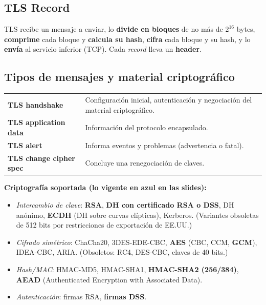\documentclass[11pt,a4paper]{article}
\begin{document}
\subsection{TLS Record}
TLS recibe un mensaje a enviar, lo \textbf{divide en bloques} de no más de $2^{16}$ bytes,
\textbf{comprime} cada bloque y \textbf{calcula su hash}, \textbf{cifra} cada bloque y su hash,
y lo \textbf{envía} al servicio inferior (TCP). Cada \emph{record} lleva un \textbf{header}.

\subsection{Tipos de mensajes y material criptográfico}

\begin{center}
\renewcommand{\arraystretch}{1.2}
\begin{tabular}{>{\bfseries}p{3.8cm} p{9.6cm}}
\toprule
TLS handshake & Configuración inicial, autenticación y negociación del material criptográfico.\\
TLS application data & Información del protocolo encapsulado.\\
TLS alert & Informa eventos y problemas (advertencia o fatal).\\
TLS change cipher spec & Concluye una renegociación de claves.\\
\bottomrule
\end{tabular}
\end{center}

\begin{slidebox}
\textbf{Criptografía soportada (lo vigente en azul en las slides):}
\begin{itemize}[leftmargin=1.4em,itemsep=0pt]
  \item \emph{Intercambio de clave}: \textbf{RSA}, \textbf{DH con certificado RSA o DSS}, DH
        anónimo, \textbf{ECDH} (DH sobre curvas elípticas), Kerberos. (Variantes obsoletas de
        512 bits por restricciones de exportación de EE.UU.)
  \item \emph{Cifrado simétrico}: ChaCha20, 3DES-EDE-CBC, \textbf{AES} (CBC, CCM,
        \textbf{GCM}), IDEA-CBC, ARIA. (Obsoletos: RC4, DES-CBC, claves de 40 bits.)
  \item \emph{Hash/MAC}: HMAC-MD5, HMAC-SHA1, \textbf{HMAC-SHA2 (256/384)}, \textbf{AEAD}
        (Authenticated Encryption with Associated Data).
  \item \emph{Autenticación}: firmas RSA, \textbf{firmas DSS}.
\end{itemize}
\end{slidebox}
\end{document}
